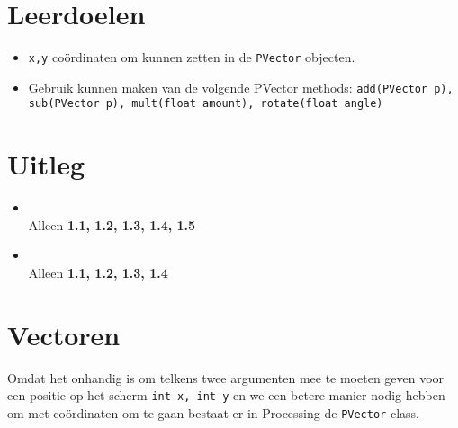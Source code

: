 \newcommand{\tttt}{Vectoren}
\newcommand{\dddd}{Datum 1}



\section{Leerdoelen}
\begin{itemize}
	\item \texttt{x,y} co\"ordinaten om kunnen zetten in de \texttt{PVector} objecten.
	\item Gebruik kunnen maken van de volgende PVector methods: \texttt{add(PVector p), sub(PVector p), mult(float amount), rotate(float angle)}
\end{itemize}

\section{Uitleg}
\begin{itemize}
\item{}\\Alleen \textbf{1.1, 1.2, 1.3, 1.4, 1.5}
\item{}\\Alleen \textbf{1.1, 1.2, 1.3, 1.4}
\end{itemize}

\section{Vectoren}
Omdat het onhandig is om telkens twee argumenten mee te moeten geven voor een positie op het scherm \texttt{int x, int y} en we een betere manier nodig hebben om met co\"ordinaten om te gaan bestaat er in Processing de \texttt{PVector} class.

